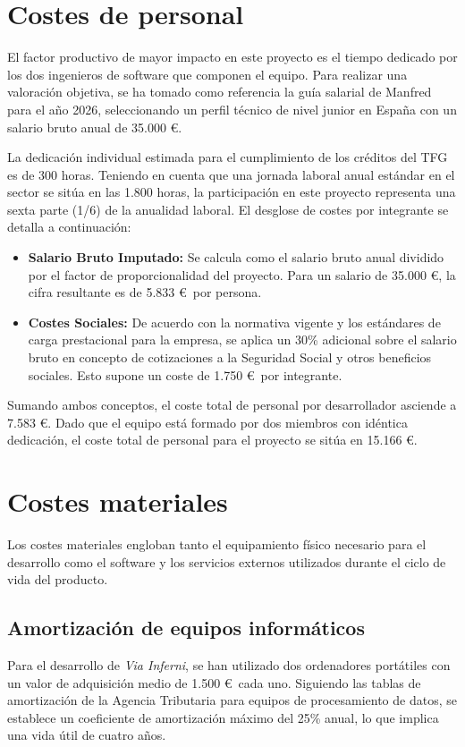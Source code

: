 \section{Costes de personal}
El factor productivo de mayor impacto en este proyecto es el tiempo dedicado por los dos ingenieros de software que componen el equipo. Para realizar una valoración objetiva, se ha tomado como referencia la guía salarial de Manfred para el año 2026, seleccionando un perfil técnico de nivel junior en España con un salario bruto anual de 35.000 \euro.

La dedicación individual estimada para el cumplimiento de los créditos del TFG es de 300 horas. Teniendo en cuenta que una jornada laboral anual estándar en el sector se sitúa en las 1.800 horas, la participación en este proyecto representa una sexta parte (1/6) de la anualidad laboral. El desglose de costes por integrante se detalla a continuación:

\begin{itemize}
    \item \textbf{Salario Bruto Imputado:} Se calcula como el salario bruto anual dividido por el factor de proporcionalidad del proyecto. Para un salario de 35.000 \euro, la cifra resultante es de 5.833 \euro\ por persona.
    \item \textbf{Costes Sociales:} De acuerdo con la normativa vigente y los estándares de carga prestacional para la empresa, se aplica un 30\% adicional sobre el salario bruto en concepto de cotizaciones a la Seguridad Social y otros beneficios sociales. Esto supone un coste de 1.750 \euro\ por integrante.
\end{itemize}

Sumando ambos conceptos, el coste total de personal por desarrollador asciende a 7.583 \euro. Dado que el equipo está formado por dos miembros con idéntica dedicación, el coste total de personal para el proyecto se sitúa en 15.166 \euro.

\section{Costes materiales}
Los costes materiales engloban tanto el equipamiento físico necesario para el desarrollo como el software y los servicios externos utilizados durante el ciclo de vida del producto.

\subsection{Amortización de equipos informáticos}
Para el desarrollo de \textit{Via Inferni}, se han utilizado dos ordenadores portátiles con un valor de adquisición medio de 1.500 \euro\ cada uno. Siguiendo las tablas de amortización de la Agencia Tributaria para equipos de procesamiento de datos, se establece un coeficiente de amortización máximo del 25\% anual, lo que implica una vida útil de cuatro años.

